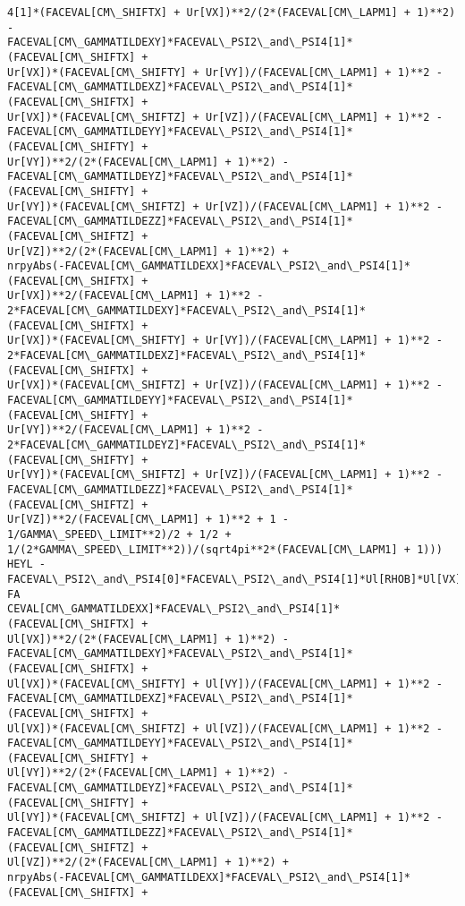 \documentclass[landscape,letterpaper,10pt,english]{article}
\begin{document}
\begin{Verbatim}[commandchars=\\\{\}]
4[1]*(FACEVAL[CM\_SHIFTX] + Ur[VX])**2/(2*(FACEVAL[CM\_LAPM1] + 1)**2) -
FACEVAL[CM\_GAMMATILDEXY]*FACEVAL\_PSI2\_and\_PSI4[1]*(FACEVAL[CM\_SHIFTX] +
Ur[VX])*(FACEVAL[CM\_SHIFTY] + Ur[VY])/(FACEVAL[CM\_LAPM1] + 1)**2 -
FACEVAL[CM\_GAMMATILDEXZ]*FACEVAL\_PSI2\_and\_PSI4[1]*(FACEVAL[CM\_SHIFTX] +
Ur[VX])*(FACEVAL[CM\_SHIFTZ] + Ur[VZ])/(FACEVAL[CM\_LAPM1] + 1)**2 -
FACEVAL[CM\_GAMMATILDEYY]*FACEVAL\_PSI2\_and\_PSI4[1]*(FACEVAL[CM\_SHIFTY] +
Ur[VY])**2/(2*(FACEVAL[CM\_LAPM1] + 1)**2) -
FACEVAL[CM\_GAMMATILDEYZ]*FACEVAL\_PSI2\_and\_PSI4[1]*(FACEVAL[CM\_SHIFTY] +
Ur[VY])*(FACEVAL[CM\_SHIFTZ] + Ur[VZ])/(FACEVAL[CM\_LAPM1] + 1)**2 -
FACEVAL[CM\_GAMMATILDEZZ]*FACEVAL\_PSI2\_and\_PSI4[1]*(FACEVAL[CM\_SHIFTZ] +
Ur[VZ])**2/(2*(FACEVAL[CM\_LAPM1] + 1)**2) +
nrpyAbs(-FACEVAL[CM\_GAMMATILDEXX]*FACEVAL\_PSI2\_and\_PSI4[1]*(FACEVAL[CM\_SHIFTX] +
Ur[VX])**2/(FACEVAL[CM\_LAPM1] + 1)**2 -
2*FACEVAL[CM\_GAMMATILDEXY]*FACEVAL\_PSI2\_and\_PSI4[1]*(FACEVAL[CM\_SHIFTX] +
Ur[VX])*(FACEVAL[CM\_SHIFTY] + Ur[VY])/(FACEVAL[CM\_LAPM1] + 1)**2 -
2*FACEVAL[CM\_GAMMATILDEXZ]*FACEVAL\_PSI2\_and\_PSI4[1]*(FACEVAL[CM\_SHIFTX] +
Ur[VX])*(FACEVAL[CM\_SHIFTZ] + Ur[VZ])/(FACEVAL[CM\_LAPM1] + 1)**2 -
FACEVAL[CM\_GAMMATILDEYY]*FACEVAL\_PSI2\_and\_PSI4[1]*(FACEVAL[CM\_SHIFTY] +
Ur[VY])**2/(FACEVAL[CM\_LAPM1] + 1)**2 -
2*FACEVAL[CM\_GAMMATILDEYZ]*FACEVAL\_PSI2\_and\_PSI4[1]*(FACEVAL[CM\_SHIFTY] +
Ur[VY])*(FACEVAL[CM\_SHIFTZ] + Ur[VZ])/(FACEVAL[CM\_LAPM1] + 1)**2 -
FACEVAL[CM\_GAMMATILDEZZ]*FACEVAL\_PSI2\_and\_PSI4[1]*(FACEVAL[CM\_SHIFTZ] +
Ur[VZ])**2/(FACEVAL[CM\_LAPM1] + 1)**2 + 1 - 1/GAMMA\_SPEED\_LIMIT**2)/2 + 1/2 +
1/(2*GAMMA\_SPEED\_LIMIT**2))/(sqrt4pi**2*(FACEVAL[CM\_LAPM1] + 1)))
HEYL -FACEVAL\_PSI2\_and\_PSI4[0]*FACEVAL\_PSI2\_and\_PSI4[1]*Ul[RHOB]*Ul[VX]/sqrt(-FA
CEVAL[CM\_GAMMATILDEXX]*FACEVAL\_PSI2\_and\_PSI4[1]*(FACEVAL[CM\_SHIFTX] +
Ul[VX])**2/(2*(FACEVAL[CM\_LAPM1] + 1)**2) -
FACEVAL[CM\_GAMMATILDEXY]*FACEVAL\_PSI2\_and\_PSI4[1]*(FACEVAL[CM\_SHIFTX] +
Ul[VX])*(FACEVAL[CM\_SHIFTY] + Ul[VY])/(FACEVAL[CM\_LAPM1] + 1)**2 -
FACEVAL[CM\_GAMMATILDEXZ]*FACEVAL\_PSI2\_and\_PSI4[1]*(FACEVAL[CM\_SHIFTX] +
Ul[VX])*(FACEVAL[CM\_SHIFTZ] + Ul[VZ])/(FACEVAL[CM\_LAPM1] + 1)**2 -
FACEVAL[CM\_GAMMATILDEYY]*FACEVAL\_PSI2\_and\_PSI4[1]*(FACEVAL[CM\_SHIFTY] +
Ul[VY])**2/(2*(FACEVAL[CM\_LAPM1] + 1)**2) -
FACEVAL[CM\_GAMMATILDEYZ]*FACEVAL\_PSI2\_and\_PSI4[1]*(FACEVAL[CM\_SHIFTY] +
Ul[VY])*(FACEVAL[CM\_SHIFTZ] + Ul[VZ])/(FACEVAL[CM\_LAPM1] + 1)**2 -
FACEVAL[CM\_GAMMATILDEZZ]*FACEVAL\_PSI2\_and\_PSI4[1]*(FACEVAL[CM\_SHIFTZ] +
Ul[VZ])**2/(2*(FACEVAL[CM\_LAPM1] + 1)**2) +
nrpyAbs(-FACEVAL[CM\_GAMMATILDEXX]*FACEVAL\_PSI2\_and\_PSI4[1]*(FACEVAL[CM\_SHIFTX] +

\end{Verbatim}
\end{document}
